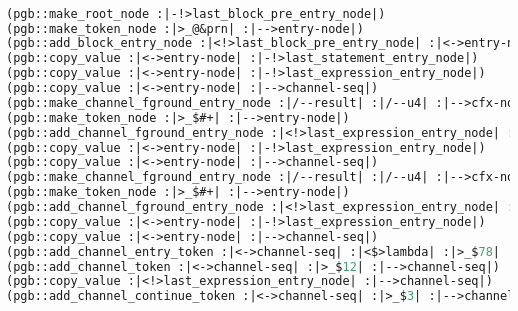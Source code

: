 \tmphs\begin{lstlisting}[language = lisp, numbers = none, 
caption={Hypergraph Intermediate Representation},label={lst:figIR},
    basicstyle = \ttfamily\bfseries\scriptsize, linewidth = .9\linewidth] 

(pgb::make_root_node :|-!>last_block_pre_entry_node|)
(pgb::make_token_node :|>_@&prn| :|-->entry-node|)
(pgb::add_block_entry_node :|<!>last_block_pre_entry_node| :|<->entry-node|)
(pgb::copy_value :|<->entry-node| :|-!>last_statement_entry_node|)
(pgb::copy_value :|<->entry-node| :|-!>last_expression_entry_node|)
(pgb::copy_value :|<->entry-node| :|-->channel-seq|)
(pgb::make_channel_fground_entry_node :|/--result| :|/--u4| :|-->cfx-node|)
(pgb::make_token_node :|>_$#+| :|-->entry-node|)
(pgb::add_channel_fground_entry_node :|<!>last_expression_entry_node| :|<->entry-node| :|/--lambda| :|<->cfx-node|)
(pgb::copy_value :|<->entry-node| :|-!>last_expression_entry_node|)
(pgb::copy_value :|<->entry-node| :|-->channel-seq|)
(pgb::make_channel_fground_entry_node :|/--result| :|/--u4| :|-->cfx-node|)
(pgb::make_token_node :|>_$#+| :|-->entry-node|)
(pgb::add_channel_fground_entry_node :|<!>last_expression_entry_node| :|<->entry-node| :|/--lambda| :|<->cfx-node|)
(pgb::copy_value :|<->entry-node| :|-!>last_expression_entry_node|)
(pgb::copy_value :|<->entry-node| :|-->channel-seq|)
(pgb::add_channel_entry_token :|<->channel-seq| :|<$>lambda| :|>_$78| :|-->channel-seq|)
(pgb::add_channel_token :|<->channel-seq| :|>_$12| :|-->channel-seq|)
(pgb::copy_value :|<!>last_expression_entry_node| :|-->channel-seq|)
(pgb::add_channel_continue_token :|<->channel-seq| :|>_$3| :|-->channel-seq|)

\end{lstlisting}

